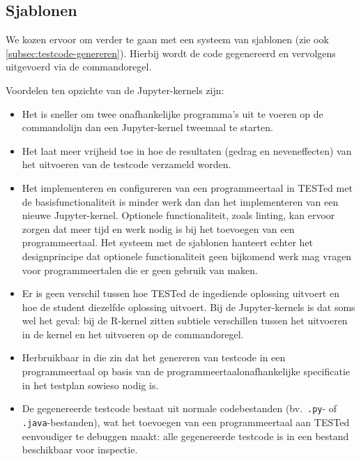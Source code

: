 \subsection{Sjablonen}\label{subsec:sjablonen}

We kozen ervoor om verder te gaan met een systeem van sjablonen (zie ook \cref{subsec:testcode-genereren}).
Hierbij wordt de code gegenereerd en vervolgens uitgevoerd via de commandoregel.

Voordelen ten opzichte van de Jupyter-kernels zijn:
\begin{itemize}
    \item Het is sneller om twee onafhankelijke programma's uit te voeren op de commandolijn dan een Jupyter-kernel tweemaal te starten.
    \item Het laat meer vrijheid toe in hoe de resultaten (gedrag en neveneffecten) van het uitvoeren van de testcode verzameld worden.
    \item Het implementeren en configureren van een programmeertaal in TESTed met de basisfunctionaliteit is minder werk dan dan het implementeren van een nieuwe Jupyter-kernel.
    Optionele functionaliteit, zoals linting, kan ervoor zorgen dat meer tijd en werk nodig is bij het toevoegen van een programmeertaal.
    Het systeem met de sjablonen hanteert echter het designprincipe dat optionele functionaliteit geen bijkomend werk mag vragen voor programmeertalen die er geen gebruik van maken.
    \item Er is geen verschil tussen hoe TESTed de ingediende oplossing uitvoert en hoe de student diezelfde oplossing uitvoert.
    Bij de Jupyter-kernels is dat soms wel het geval: bij de R-kernel zitten subtiele verschillen tussen het uitvoeren in de kernel en het uitvoeren op de commandoregel.
    \item Herbruikbaar in die zin dat het genereren van testcode in een programmeertaal op basis van de programmeertaalonafhankelijke specificatie in het testplan sowieso nodig is.
    \item De gegenereerde testcode bestaat uit normale codebestanden (bv.\ \texttt{.py}- of \texttt{.java}-bestanden), wat het toevoegen van een programmeertaal aan TESTed eenvoudiger te debuggen maakt: alle gegenereerde testcode is in een bestand beschikbaar voor inspectie.
\end{itemize}

